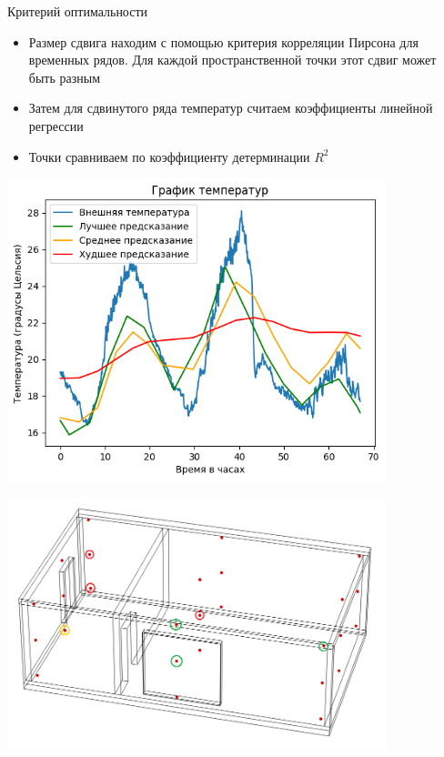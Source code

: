 \documentclass[14pt,aspectratio=169,hyperref={pdftex,unicode},xcolor=dvipsnames]{beamer}
\begin{document}
\begin{frame}{Критерий оптимальности}

\begin{itemize}
\item Размер сдвига находим с помощью критерия корреляции Пирсона для временных рядов. Для каждой пространственной точки этот сдвиг может быть разным
\item Затем для сдвинутого ряда температур считаем коэффициенты линейной регрессии
\item Точки сравниваем по коэффициенту детерминации $R^2$
\end{itemize}

\end{frame}



\begin{frame} \begin{center}
\includegraphics[width=11cm]{images/graphics/result.png}
\end{center} \end{frame}

\begin{frame} \begin{center}
\includegraphics[width=11cm]{images/interesting_points_result.png}
\end{center} \end{frame}
\end{document}
